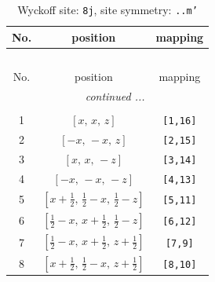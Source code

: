 \documentclass[fleqn,8pt]{jsarticle}
\begin{document}
\begin{longtable}{ccc}
\caption{Wyckoff site: {\tt 8j}, site symmetry: {\tt ..m'}}
 \\
 \hline \hline
No. & position & mapping \\ \hline \endfirsthead

\multicolumn{2}{l}{\tablename\ \thetable{}} \\
 \hline \hline
No. & position & mapping \\ \hline \endhead

 \hline \hline
\multicolumn{2}{r}{\footnotesize\it continued ...} \\ \endfoot

 \hline \hline
\multicolumn{2}{r}{} \\ \endlastfoot

1 & $\left[ x,\, x,\, z \right]$ & {\tt [1,16]} \\ \hline
2 & $\left[ - x,\, - x,\, z \right]$ & {\tt [2,15]} \\ \hline
3 & $\left[ x,\, x,\, - z \right]$ & {\tt [3,14]} \\ \hline
4 & $\left[ - x,\, - x,\, - z \right]$ & {\tt [4,13]} \\ \hline
5 & $\left[ x + \frac{1}{2},\, \frac{1}{2} - x,\, \frac{1}{2} - z \right]$ & {\tt [5,11]} \\ \hline
6 & $\left[ \frac{1}{2} - x,\, x + \frac{1}{2},\, \frac{1}{2} - z \right]$ & {\tt [6,12]} \\ \hline
7 & $\left[ \frac{1}{2} - x,\, x + \frac{1}{2},\, z + \frac{1}{2} \right]$ & {\tt [7,9]} \\ \hline
8 & $\left[ x + \frac{1}{2},\, \frac{1}{2} - x,\, z + \frac{1}{2} \right]$ & {\tt [8,10]} \\
\end{longtable}
\renewcommand{\arraystretch}{1.2}
\end{document}
